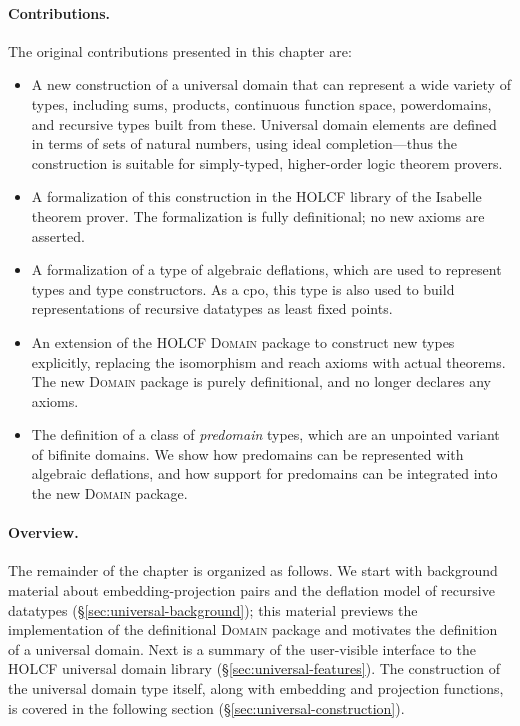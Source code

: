 \paragraph{Contributions.} The original contributions presented in this chapter are:
\begin{itemize}

\item A new construction of a universal domain that can represent a wide variety of types, including sums, products, continuous function space, powerdomains, and recursive types built from these. Universal domain elements are defined in terms of sets of natural numbers, using ideal completion---thus the construction is suitable for simply-typed, higher-order logic theorem provers.

\item A formalization of this construction in the HOLCF library of the Isabelle theorem prover. The formalization is fully definitional; no new axioms are asserted.

\item A formalization of a type of algebraic deflations, which are used to represent types and type constructors. As a cpo, this type is also used to build representations of recursive datatypes as least fixed points.

\item An extension of the HOLCF \textsc{Domain} package to construct new types explicitly, replacing the isomorphism and reach axioms with actual theorems. The new \textsc{Domain} package is purely definitional, and no longer declares any axioms.

\item The definition of a class of \emph{predomain} types, which are an unpointed variant of bifinite domains. We show how predomains can be represented with algebraic deflations, and how support for predomains can be integrated into the new \textsc{Domain} package.

\end{itemize}

\paragraph{Overview.} The remainder of the chapter is organized as follows. We start with background material about embedding-projection pairs and the deflation model of recursive datatypes (\S\ref{sec:universal-background}); this material previews the implementation of the definitional \textsc{Domain} package and motivates the definition of a universal domain. Next is a summary of the user-visible interface to the HOLCF universal domain library (\S\ref{sec:universal-features}). The construction of the universal domain type itself, along with embedding and projection functions, is covered in the following section (\S\ref{sec:universal-construction}).

